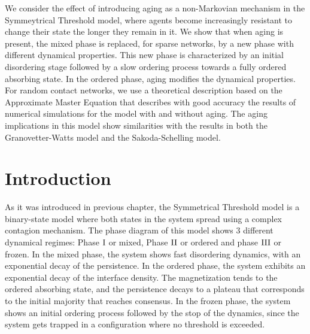 We consider the effect of introducing aging as a non-Markovian mechanism in the Symmeytrical Threshold model, where agents become increasingly resistant to change their state the longer they remain in it. We show that when aging is present, the mixed phase is replaced, for sparse networks, by a new phase with different dynamical properties. This new phase is characterized by an initial disordering stage followed by a slow ordering process towards a fully ordered absorbing state. In the ordered phase, aging modifies the dynamical properties. For random contact networks, we use a theoretical description based on the Approximate Master Equation that describes with good accuracy the results of numerical simulations for the model with and without aging. The aging implications in this model show similarities with the results in both the Granovetter-Watts model and the Sakoda-Schelling model.

\section{\label{sec:Introduction_Chapter6} Introduction}

As it was introduced in previous chapter, the Symmetrical Threshold model is a binary-state model where both states in the system spread using a complex contagion mechanism. The phase diagram of this model shows 3 different dynamical regimes: Phase ${\rm I}$ or mixed, Phase ${\rm II}$ or ordered and phase ${\rm III}$ or frozen. In the mixed phase, the system shows fast disordering dynamics, with an exponential decay of the persistence. In the ordered phase, the system exhibits an exponential decay of the interface density. The magnetization tends to the ordered absorbing state, and the persistence decays to a plateau that corresponds to the initial majority that reaches consensus. In the frozen phase, the system shows an initial ordering process followed by the stop of the dynamics, since the system gets trapped in a configuration where no threshold is exceeded.

